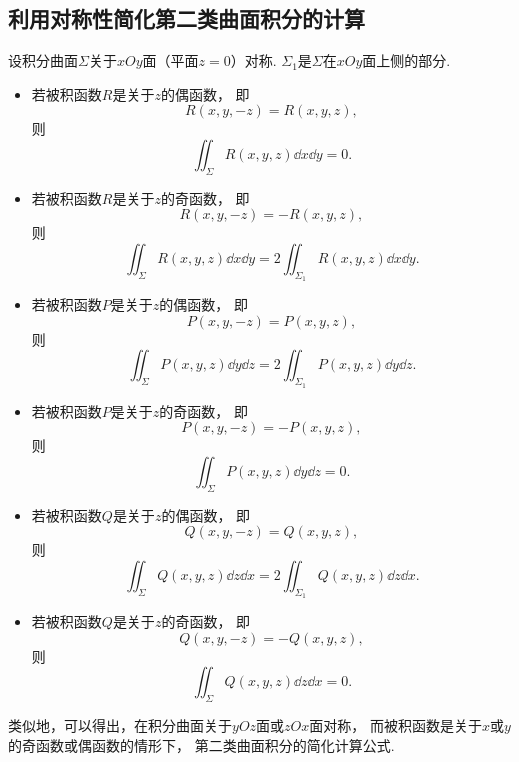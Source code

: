 \subsection{利用对称性简化第二类曲面积分的计算}
\label{section:线积分与面积分.利用对称性简化第二类曲面积分的计算}
设积分曲面\(\Sigma\)关于\(xOy\)面（平面\(z=0\)）对称.
\(\Sigma_1\)是\(\Sigma\)在\(xOy\)面上侧的部分.
\begin{itemize}
	\item 若被积函数\(R\)是关于\(z\)的偶函数，
	即\begin{equation*}
		R(x,y,-z) = R(x,y,z),
	\end{equation*}
	则\begin{equation*}
		\iint_\Sigma R(x,y,z) \dd{x}\dd{y} = 0.
	\end{equation*}

	\item 若被积函数\(R\)是关于\(z\)的奇函数，
	即\begin{equation*}
		R(x,y,-z) = -R(x,y,z),
	\end{equation*}
	则\begin{equation*}
		\iint_\Sigma R(x,y,z) \dd{x}\dd{y}
		= 2 \iint_{\Sigma_1} R(x,y,z) \dd{x}\dd{y}.
	\end{equation*}

	\item 若被积函数\(P\)是关于\(z\)的偶函数，
	即\begin{equation*}
		P(x,y,-z) = P(x,y,z),
	\end{equation*}
	则\begin{equation*}
		\iint_\Sigma P(x,y,z) \dd{y}\dd{z}
		= 2\iint_{\Sigma_1} P(x,y,z) \dd{y}\dd{z}.
	\end{equation*}

	\item 若被积函数\(P\)是关于\(z\)的奇函数，
	即\begin{equation*}
		P(x,y,-z) = -P(x,y,z),
	\end{equation*}
	则\begin{equation*}
		\iint_\Sigma P(x,y,z) \dd{y}\dd{z} = 0.
	\end{equation*}

	\item 若被积函数\(Q\)是关于\(z\)的偶函数，
	即\begin{equation*}
		Q(x,y,-z) = Q(x,y,z),
	\end{equation*}
	则\begin{equation*}
		\iint_\Sigma Q(x,y,z) \dd{z}\dd{x}
		= 2\iint_{\Sigma_1} Q(x,y,z) \dd{z}\dd{x}.
	\end{equation*}

	\item 若被积函数\(Q\)是关于\(z\)的奇函数，
	即\begin{equation*}
		Q(x,y,-z) = -Q(x,y,z),
	\end{equation*}
	则\begin{equation*}
		\iint_\Sigma Q(x,y,z) \dd{z}\dd{x} = 0.
	\end{equation*}
\end{itemize}

类似地，可以得出，在积分曲面关于\(yOz\)面或\(zOx\)面对称，
而被积函数是关于\(x\)或\(y\)的奇函数或偶函数的情形下，
第二类曲面积分的简化计算公式.
